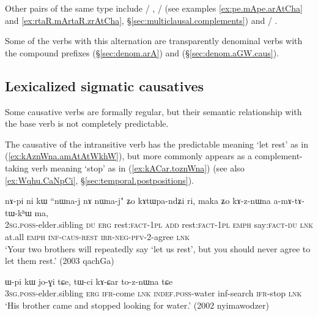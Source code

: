  Other pairs of the same type include   / ,   /  (see examples \ref{ex:pe.mApe.arAtCha} and \ref{ex:rtaR.mArtaR.zrAtCha}, §\ref{sec:multiclausal.complements}) and 	/ . 
 
 Some of the verbs with this  alternation are transparently denominal verbs with the compound prefixes  (§\ref{sec:denom.arA}) and  (§\ref{sec:denom.aGW.caus}).

 

\subsection{Lexicalized sigmatic causatives} \label{sec:sig.caus.lexicalized}
Some causative verbs are formally regular, but their semantic relationship with the base verb is not completely predictable.

The causative  of the intransitive verb  has the predictable meaning `let rest' as in (\ref{ex:kAznWna.amAtAtWkhW}), but more commonly appears as a com\-ple\-ment-taking verb meaning `stop' as in (\ref{ex:kACar.toznWna}) (see also \ref{ex:Wqhu.CaNpCi}, §\ref{sec:temporal.postpositions}).

\begin{exe} 
\ex \label{ex:kAznWna.amAtAtWkhW}
\gll nɤ-pi ni kɯ ``nɯna-j nɤ nɯna-j" ʑo kɤtɯpa-ndʑi ri, maka ʑo kɤ-z-nɯna a-mɤ-tɤ-tɯ-kʰɯ ma,\\
\textsc{2sg}.\textsc{poss}-elder.sibling \textsc{du} \textsc{erg} rest:\textsc{fact}-\textsc{1pl} \textsc{add}  rest:\textsc{fact}-\textsc{1pl} \textsc{emph} say:\textsc{fact}-\textsc{du} \textsc{lnk} at.all \textsc{emph} \textsc{inf}-\textsc{caus}-\textsc{rest} \textsc{irr}-\textsc{neg}-\textsc{pfv}-2-agree \textsc{lnk} \\
\glt `Your two brothers will repeatedly say `let us rest', but you should never agree to let them rest.' (2003 qachGa)
\end{exe}

\begin{exe} 
\ex \label{ex:kACar.toznWna}
\gll ɯ-pi kɯ jo-ɣi tɕe, tɯ-ci kɤ-ɕar to-z-nɯna tɕe \\
\textsc{3sg}.\textsc{poss}-elder.sibling \textsc{erg} \textsc{ifr}-come \textsc{lnk} \textsc{indef}.\textsc{poss}-water inf-search \textsc{ifr}-stop \textsc{lnk} \\
\glt `His brother came and stopped looking for water.' (2002 nyimawodzer)
\end{exe}

